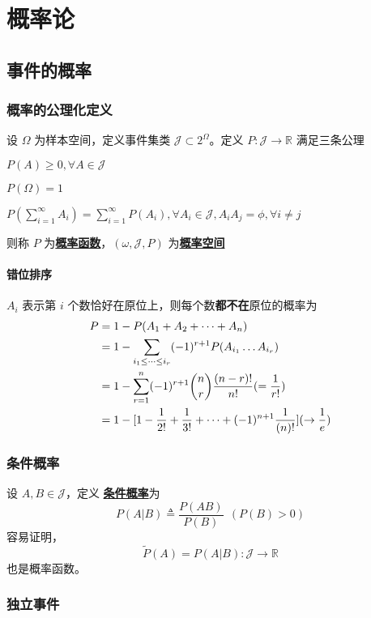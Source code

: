 \documentclass[./main.tex]{subfiles}
\begin{document}
\chapter{概率论}
\section{事件的概率}
\subsection{概率的公理化定义}
\noindent 设 $\Omega$ 为样本空间，定义事件集类 $\mathscr{J}\subset2^\Omega$。定义 $P:\mathscr{J}\rightarrow\mathbb{R}$ 满足三条公理
\begin{enumerate*}
    \item $P(A)\ge 0,\forall A\in\mathscr{J}$
    \item $P(\Omega)=1$
    \item $P(\sum_{i=1}^{\infty}A_i)=\sum_{i=1}^{\infty}P(A_i),\forall A_i\in\mathscr{J},A_iA_j=\phi,\forall i\neq j$
\end{enumerate*}
则称 $P$ 为\underline{\textbf{概率函数}}，$(\omega,\mathscr{J},P)$ 为\underline{\textbf{概率空间}}
\subsubsection{错位排序}
$A_i$ 表示第 $i$ 个数恰好在原位上，则每个数\textbf{都不在}原位的概率为
\begin{align}
    P&=1-P(A_1+A_2+\dots+A_n)\notag\\
    &=1-\sum_{i_1\le\dots\le i_r}(-1)^{r+1}P(A_{i_1}\dots A_{i_r})\notag\\
    &=1-\sum_{r=1}^n(-1)^{r+1}\binom{n}{r}\frac{(n-r)!}{n!}(=\frac{1}{r!})\notag\\
    &=1-[1-\frac{1}{2!}+\frac{1}{3!}+\dots+(-1)^{n+1}\frac{1}{(n)!}](\rightarrow \frac{1}{e})
\end{align}
\subsection{条件概率}
设 $A,B\in\mathscr{J}$，定义 \underline{\textbf{条件概率}}为
\begin{equation}
    P(A|B)\triangleq\frac{P(AB)}{P(B)}\ \ (P(B)>0)
\end{equation}
容易证明，$$\widetilde{P}(A)=P(A|B):\mathscr{J}\rightarrow\mathbb{R}$$ 也是概率函数。
\subsection{独立事件}
\end{document}
